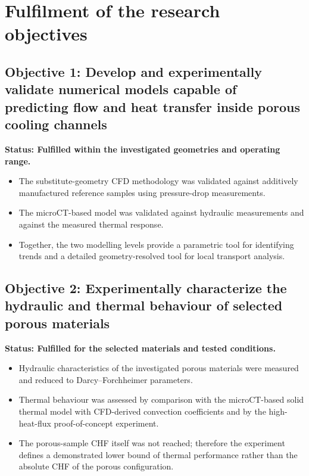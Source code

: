 \documentclass[a4paper]{article}
\begin{document}
\section{Fulfilment of the research objectives}

\subsection{Objective 1: Develop and experimentally validate numerical models capable of predicting flow and heat transfer inside porous cooling channels}
\textbf{Status: Fulfilled within the investigated geometries and operating range.}
\begin{itemize}
    \item The substitute-geometry CFD methodology was validated against additively manufactured reference samples using pressure-drop measurements.
    \item The microCT-based model was validated against hydraulic measurements and against the measured thermal response.
    \item Together, the two modelling levels provide a parametric tool for identifying trends and a detailed geometry-resolved tool for local transport analysis.
\end{itemize}

\subsection{Objective 2: Experimentally characterize the hydraulic and thermal behaviour of selected porous materials}
\textbf{Status: Fulfilled for the selected materials and tested conditions.}
\begin{itemize}
    \item Hydraulic characteristics of the investigated porous materials were measured and reduced to Darcy--Forchheimer parameters.
    \item Thermal behaviour was assessed by comparison with the microCT-based solid thermal model with CFD-derived convection coefficients and by the high-heat-flux proof-of-concept experiment.
    \item The porous-sample CHF itself was not reached; therefore the experiment defines a demonstrated lower bound of thermal performance rather than the absolute CHF of the porous configuration.
\end{itemize}
\end{document}
